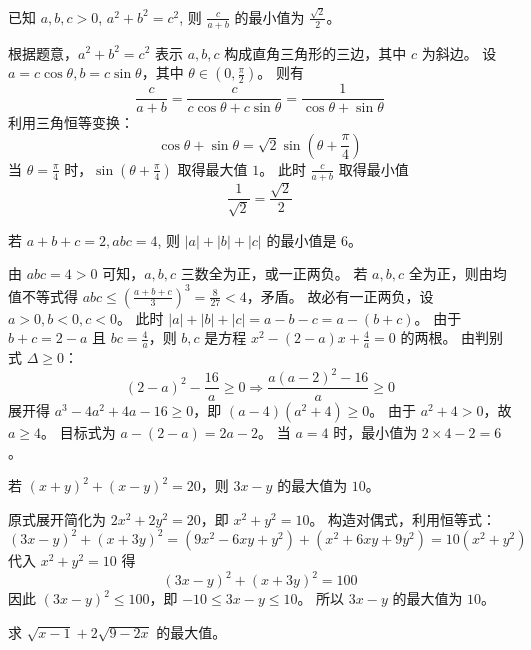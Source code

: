 \begin{questions}
\question 已知 $a,b,c > 0$, $a^2 + b^2 = c^2$, 则 $\frac{c}{a+b}$ 的最小值为 $\frac{\sqrt{2}}{2}$。

\begin{solution}
根据题意，$a^2 + b^2 = c^2$ 表示 $a, b, c$ 构成直角三角形的三边，其中 $c$ 为斜边。
设 $a = c \cos \theta, b = c \sin \theta$，其中 $\theta \in \left( 0, \frac{\pi}{2} \right)$。
则有
\[
\frac{c}{a+b} = \frac{c}{c \cos \theta + c \sin \theta} = \frac{1}{\cos \theta + \sin \theta}
\]
利用三角恒等变换：
\[
\cos \theta + \sin \theta = \sqrt{2} \sin \left( \theta + \frac{\pi}{4} \right)
\]
当 $\theta = \frac{\pi}{4}$ 时，$\sin \left( \theta + \frac{\pi}{4} \right)$ 取得最大值 $1$。
此时 $\frac{c}{a+b}$ 取得最小值
\[
\frac{1}{\sqrt{2}} = \frac{\sqrt{2}}{2}
\]
\end{solution}

\question 若 $a+b+c = 2, abc = 4$, 则 $|a| + |b| + |c|$ 的最小值是 $6$。

\begin{solution}
由 $abc = 4 > 0$ 可知，$a, b, c$ 三数全为正，或一正两负。
若 $a, b, c$ 全为正，则由均值不等式得 $abc \le \left( \frac{a+b+c}{3} \right)^3 = \frac{8}{27} < 4$，矛盾。
故必有一正两负，设 $a > 0, b < 0, c < 0$。
此时 $|a| + |b| + |c| = a - b - c = a - (b+c)$。
由于 $b+c = 2-a$ 且 $bc = \frac{4}{a}$，则 $b, c$ 是方程 $x^2 - (2-a)x + \frac{4}{a} = 0$ 的两根。
由判别式 $\Delta \ge 0$：
\[
(2-a)^2 - \frac{16}{a} \ge 0 \Rightarrow \frac{a(a-2)^2 - 16}{a} \ge 0
\]
展开得 $a^3 - 4a^2 + 4a - 16 \ge 0$，即 $(a-4)(a^2+4) \ge 0$。
由于 $a^2+4 > 0$，故 $a \ge 4$。
目标式为 $a - (2-a) = 2a - 2$。
当 $a = 4$ 时，最小值为 $2 \times 4 - 2 = 6$。
\end{solution}

\question 若 $(x+y)^2 + (x-y)^2 = 20$，则 $3x-y$ 的最大值为 $10$。

\begin{solution}
原式展开简化为 $2x^2 + 2y^2 = 20$，即 $x^2 + y^2 = 10$。
构造对偶式，利用恒等式：
\[
(3x-y)^2 + (x+3y)^2 = (9x^2 - 6xy + y^2) + (x^2 + 6xy + 9y^2) = 10(x^2 + y^2)
\]
代入 $x^2 + y^2 = 10$ 得
\[
(3x-y)^2 + (x+3y)^2 = 100
\]
因此 $(3x-y)^2 \le 100$，即 $-10 \le 3x-y \le 10$。
所以 $3x-y$ 的最大值为 $10$。
\end{solution}
\question 求 $\sqrt{x-1} + 2\sqrt{9-2x}$ 的最大值。


\end{questions}
